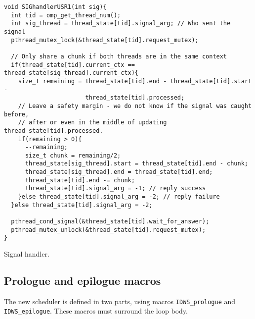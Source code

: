 \documentclass{acm_proc_article-sp}
\begin{document}
\begin{code*}
\begin{lstlisting}
void SIGhandlerUSR1(int sig){
  int tid = omp_get_thread_num();
  int sig_thread = thread_state[tid].signal_arg; // Who sent the signal
  pthread_mutex_lock(&thread_state[tid].request_mutex);
  
  // Only share a chunk if both threads are in the same context
  if(thread_state[tid].current_ctx == thread_state[sig_thread].current_ctx){
    size_t remaining = thread_state[tid].end - thread_state[tid].start -
                       thread_state[tid].processed;
    // Leave a safety margin - we do not know if the signal was caught before,
    // after or even in the middle of updating thread_state[tid].processed.
    if(remaining > 0){
      --remaining;
      size_t chunk = remaining/2;
      thread_state[sig_thread].start = thread_state[tid].end - chunk;
      thread_state[sig_thread].end = thread_state[tid].end;
      thread_state[tid].end -= chunk;
      thread_state[tid].signal_arg = -1; // reply success
    }else thread_state[tid].signal_arg = -2; // reply failure
  }else thread_state[tid].signal_arg = -2;
  
  pthread_cond_signal(&thread_state[tid].wait_for_answer);
  pthread_mutex_unlock(&thread_state[tid].request_mutex);
}
\end{lstlisting}
\caption{Signal handler.}
\label{code:signal_handler}
\end{code*}

\subsection{Prologue and epilogue macros}
\label{subsect:macros}
The new scheduler is defined in two parts, using macros \texttt{IDWS\_prologue} 
and \texttt{IDWS\_epilogue}. These macros must surround the loop body.
\end{document}

